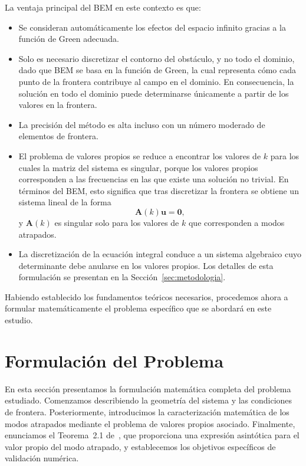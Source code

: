 \documentclass[11pt]{article}
\begin{document}
La ventaja principal del BEM en este contexto es que:
\begin{itemize}
    \item Se consideran automáticamente los efectos del espacio infinito gracias a la función de Green adecuada.
    \item Solo es necesario discretizar el contorno del obstáculo, y no todo el dominio, dado que BEM se basa en la función de Green, la cual representa cómo cada punto de la frontera contribuye al campo en el dominio. En consecuencia, la solución en todo el dominio puede determinarse únicamente a partir de los valores en la frontera.
    \item La precisión del método es alta incluso con un número moderado de elementos de frontera.
    \item El problema de valores propios se reduce a encontrar los valores de $k$ para los cuales la matriz del sistema es singular, porque los valores propios corresponden a las frecuencias en las que existe una solución no trivial. En términos del BEM, esto significa que tras discretizar la frontera se obtiene un sistema lineal de la forma
    \[
    \mathbf{A}(k) \mathbf{u} = \mathbf{0},
    \]
    y $\mathbf{A}(k)$ es singular solo para los valores de $k$ que corresponden a modos atrapados.
    \item La discretización de la ecuación integral conduce a un sistema algebraico cuyo determinante debe anularse en los valores propios. Los detalles de esta formulación se presentan en la Sección~\ref{sec:metodologia}.

\end{itemize}

Habiendo establecido los fundamentos teóricos necesarios, procedemos ahora a formular matemáticamente el problema específico que se abordará en este estudio.

\section{Formulación del Problema}\label{sec:formulacion}

En esta sección presentamos la formulación matemática completa del problema estudiado. Comenzamos describiendo la geometría del sistema y las condiciones de frontera. Posteriormente, introducimos la caracterización matemática de los modos atrapados mediante el problema de valores propios asociado. Finalmente, enunciamos el Teorema~2.1 de~\cite{Zhevandrov2025}, que proporciona una expresión asintótica para el valor propio del modo atrapado, y establecemos los objetivos específicos de validación numérica.
\end{document}
